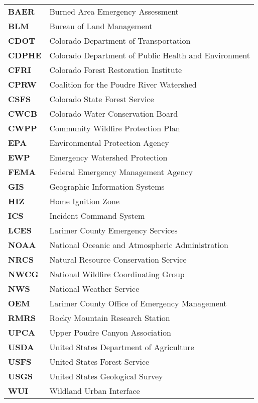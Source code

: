 \documentclass[
]{article}
\begin{document}
\begin{longtable}{>{}ll}

\textbf{BAER} & Burned Area Emergency Assessment\\
\textbf{BLM} & Bureau of Land Management\\
\textbf{CDOT} & Colorado Department of Transportation\\
\textbf{CDPHE} & Colorado Department of Public Health and Environment\\
\textbf{CFRI} & Colorado Forest Restoration Institute\\
\addlinespace
\textbf{CPRW} & Coalition for the Poudre River Watershed\\
\textbf{CSFS} & Colorado State Forest Service\\
\textbf{CWCB} & Colorado Water Conservation Board\\
\textbf{CWPP} & Community Wildfire Protection Plan\\
\textbf{EPA} & Environmental Protection Agency\\
\addlinespace
\textbf{EWP} & Emergency Watershed Protection\\
\textbf{FEMA} & Federal Emergency Management Agency\\
\textbf{GIS} & Geographic Information Systems\\
\textbf{HIZ} & Home Ignition Zone\\
\textbf{ICS} & Incident Command System\\
\addlinespace
\textbf{LCES} & Larimer County Emergency Services\\
\textbf{NOAA} & National Oceanic and Atmospheric Administration\\
\textbf{NRCS} & Natural Resource Conservation Service\\
\textbf{NWCG} & National Wildfire Coordinating Group\\
\textbf{NWS} & National Weather Service\\
\addlinespace
\textbf{OEM} & Larimer County Office of Emergency Management\\
\textbf{RMRS} & Rocky Mountain Research Station\\
\textbf{UPCA} & Upper Poudre Canyon Association\\
\textbf{USDA} & United States Department of Agriculture\\
\textbf{USFS} & United States Forest Service\\
\addlinespace
\textbf{USGS} & United States Geological Survey\\
\textbf{WUI} & Wildland Urban Interface\\

\end{longtable}
\end{document}
